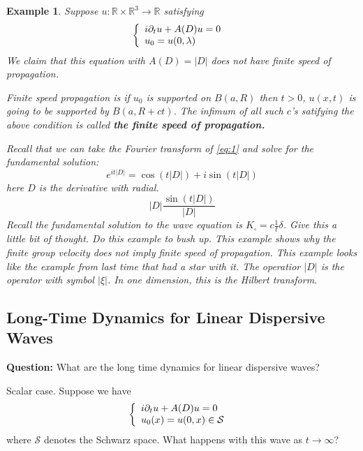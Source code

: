 \documentclass{article}
\makeatletter
\newtheorem{example}{Example}
\newcommand{\vt}{\vskip 5mm} %
\newcommand{\Fl}{\vt\noindent\textbf} %
\def\R{\mathbb{R}} %
\newcommand{\curly}[2]{\left\{ \begin{array}{l@{\quad}l}#1\\#2\end{array}\right.}
\makeatother
\begin{document}
\begin{example}
  Suppose $u:\R\times\R^{3}\to \R$ satisfying
  \begin{equation}\label{eq:1}
    \curly{i\partial_{t}u +A(D)u =0}{u_{0}=u(0,\lambda)}
  \end{equation}
  We claim that this equation with $A(D)=|D|$ does not have finite speed of
  propagation.

  Finite speed propagation is if $u_{0}$ is supported on $B(a,R)$ then $t>0$,
  $u(x,t)$ is going to be supported by $B(a,R+ct)$. The infimum of all such $c$'s
  satifying the above condition is called \textbf{the finite speed of
    propagation.}

  Recall that we can take the Fourier transform of \cref{eq:1} and solve for the
  fundamental solution:
  \begin{equation*}
    e^{it|D|} = \cos(t|D|)+ i \sin(t|D|)
  \end{equation*}
  here $D$ is the derivative with radial.
  \begin{equation*}
    |D| \frac{\sin(t|D|)}{|D|}
  \end{equation*}
  Recall the fundamental solution to the wave equation is
  $K_{\square}= c \frac{1}{t}\delta$. Give this a little bit of thought. Do this
  example to bush up. This example shows why the finite group velocity does not
  imply finite speed of propagation. This example looks like the example from
  last time that had a star with it. The operatior $|D|$ is the operator with
  symbol $|\xi|$. In one dimension, this is the Hilbert transform.
\end{example}


\subsection{Long-Time Dynamics for Linear Dispersive Waves}
\Fl{Question:} What are the long time dynamics for linear dispersive waves?


Scalar case. Suppose we have
\begin{equation*}
  \curly{i\partial_{t}u +A(D)u=0}{u_{0}(x)=u(0,x)\in \mathcal{S}}
\end{equation*}
where $\mathcal{S}$ denotes the Schwarz space. What happens with this wave as
$t \to \infty$?
\end{document}
